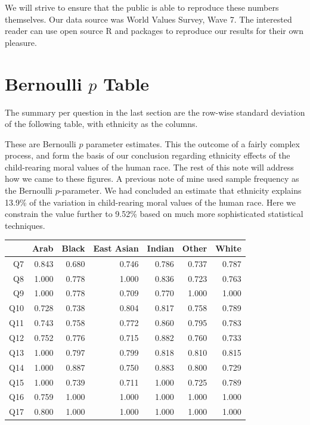 \documentclass{amsart}
\begin{document}
We will strive to ensure that the public is able to reproduce these numbers themselves.  Our data source was World Values Survey, Wave 7.  The interested reader can use open source R and packages to reproduce our results for their own pleasure.

\section{Bernoulli $p$ Table}

The summary per question in the last section are the row-wise standard deviation of the following table, with ethnicity as the columns.  

These are Bernoulli $p$ parameter estimates.  This the outcome of a fairly complex process, and form the basis of our conclusion regarding ethnicity effects of the child-rearing moral values of the human race.  The rest of this note will address how we came to these figures.  A previous note of mine used sample frequency as the Bernoulli $p$-parameter.  We had concluded an estimate that ethnicity explains 13.9\% of the variation in child-rearing moral values of the human race.  Here we constrain the value further to 9.52\% based on much more sophisticated statistical techniques.

\begin{table}[ht]
\centering
\begin{tabular}{rrrrrrr}
  \hline
 & Arab & Black & East Asian & Indian & Other & White \\ 
  \hline
Q7 & 0.843 & 0.680 & 0.746 & 0.786 & 0.737 & 0.787 \\ 
  Q8 & 1.000 & 0.778 & 1.000 & 0.836 & 0.723 & 0.763 \\ 
  Q9 & 1.000 & 0.778 & 0.709 & 0.770 & 1.000 & 1.000 \\ 
  Q10 & 0.728 & 0.738 & 0.804 & 0.817 & 0.758 & 0.789 \\ 
  Q11 & 0.743 & 0.758 & 0.772 & 0.860 & 0.795 & 0.783 \\ 
  Q12 & 0.752 & 0.776 & 0.715 & 0.882 & 0.760 & 0.733 \\ 
  Q13 & 1.000 & 0.797 & 0.799 & 0.818 & 0.810 & 0.815 \\ 
  Q14 & 1.000 & 0.887 & 0.750 & 0.883 & 0.800 & 0.729 \\ 
  Q15 & 1.000 & 0.739 & 0.711 & 1.000 & 0.725 & 0.789 \\ 
  Q16 & 0.759 & 1.000 & 1.000 & 1.000 & 1.000 & 1.000 \\ 
  Q17 & 0.800 & 1.000 & 1.000 & 1.000 & 1.000 & 1.000 \\ 
   \hline
\end{tabular}
\end{table}
\end{document}
